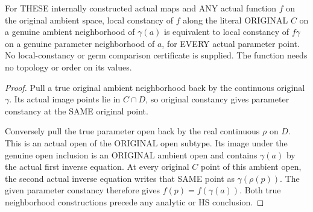 \begin{lemma}
\label{hir:actual-original-centre-parameter-neighborhood-localconst}
\leanok
For THESE internally constructed actual maps and ANY actual function $f$
on the original ambient space, local constancy of $f$ along the literal
ORIGINAL $C$ on a genuine ambient neighborhood of $\gamma(a)$ is equivalent
to local constancy of $f\gamma$ on a genuine parameter neighborhood of $a$,
for EVERY actual parameter point. No local-constancy or germ comparison
certificate is supplied. The function needs no topology or order on its
values.
\end{lemma}
\begin{proof}
Pull a true original ambient neighborhood back by the continuous original
$\gamma$. Its actual image points lie in $C\cap D$, so original constancy
gives parameter constancy at the SAME original point.

Conversely pull the true parameter open back by the real continuous
$\rho$ on $D$. This is an actual open of the ORIGINAL open subtype. Its
image under the genuine open inclusion is an ORIGINAL ambient open and
contains $\gamma(a)$ by the actual first inverse equation. At every
original $C$ point of this ambient open, the second actual inverse equation
writes that SAME point as $\gamma(\rho(p))$. The given parameter constancy
therefore gives $f(p)=f(\gamma(a))$. Both true neighborhood constructions
precede any analytic or HS conclusion.
\end{proof}

